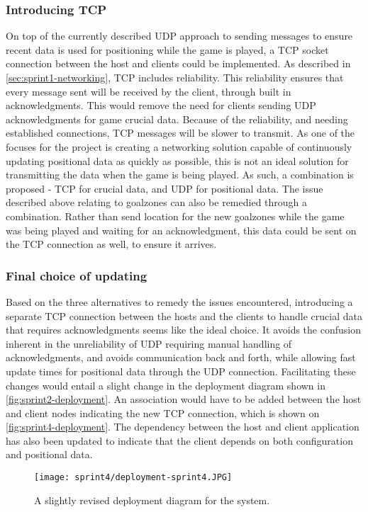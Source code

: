 \subsubsection{Introducing TCP}
On top of the currently described UDP approach to sending messages to ensure recent data is used for positioning while the game is played, a TCP socket connection between the host and clients could be implemented.
As described in \autoref{sec:sprint1-networking}, TCP includes reliability.
This reliability ensures that every message sent will be received by the client, through built in acknowledgments.
This would remove the need for clients sending UDP acknowledgments for game crucial data.
Because of the reliability, and needing established connections, TCP messages will be slower to transmit.
As one of the focuses for the project is creating a networking solution capable of continuously updating positional data as quickly as possible, this is not an ideal solution for transmitting the data when the game is being played.
As such, a combination is proposed - TCP for crucial data, and UDP for positional data.
The issue described above relating to goalzones can also be remedied through a combination.
Rather than send location for the new goalzones while the game was being played and waiting for an acknowledgment, this data could be sent on the TCP connection as well, to ensure it arrives.

\subsubsection{Final choice of updating}
Based on the three alternatives to remedy the issues encountered, introducing a separate TCP connection between the hosts and the clients to handle crucial data that requires acknowledgments seems like the ideal choice.
It avoids the confusion inherent in the unreliability of UDP requiring manual handling of acknowledgments, and avoids communication back and forth, while allowing fast update times for positional data through the UDP connection.
Facilitating these changes would entail a slight change in the deployment diagram shown in \autoref{fig:sprint2-deployment}.
An association would have to be added between the host and client nodes indicating the new TCP connection, which is shown on \autoref{fig:sprint4-deployment}.
The dependency between the host and client application has also been updated to indicate that the client depends on both configuration and positional data.
\begin{figure}[H]
    \centering
    \texttt{[image: sprint4/deployment-sprint4.JPG]}
    \caption{A slightly revised deployment diagram for the system.}
    \label{fig:sprint4-deployment}
\end{figure}
\noindent
